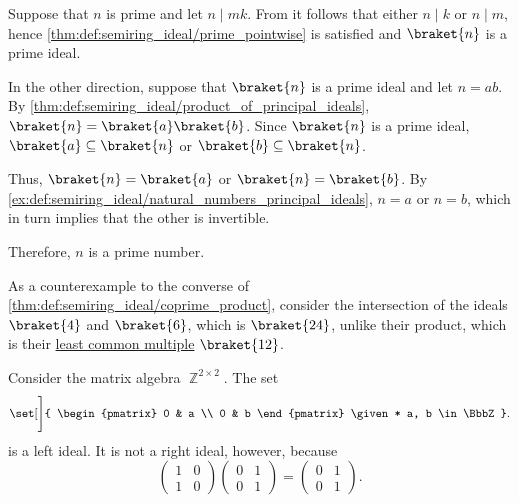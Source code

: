 \begin{example}
\begin{thmenum}
    Suppose that \( n \) is prime and let \( n \mid mk \). From  it follows that either \( n \mid k \) or \( n \mid m \), hence \cref{thm:def:semiring_ideal/prime_pointwise} is satisfied and \( \braket{ n } \) is a prime ideal.

    In the other direction, suppose that \( \braket{ n } \) is a prime ideal and let \( n = ab \). By \cref{thm:def:semiring_ideal/product_of_principal_ideals}, \( \braket{ n } = \braket{ a } \braket{ b } \). Since \( \braket{ n } \) is a prime ideal, \( \braket{ a } \subseteq \braket{ n } \) or \( \braket{ b } \subseteq \braket{ n } \).

    Thus, \( \braket{ n } = \braket{ a } \) or \( \braket{ n } = \braket{ b } \). By \cref{ex:def:semiring_ideal/natural_numbers_principal_ideals}, \( n = a \) or \( n = b \), which in turn implies that the other is invertible.

    Therefore, \( n \) is a prime number.

     As a counterexample to the converse of \cref{thm:def:semiring_ideal/coprime_product}, consider the intersection of the ideals \( \braket{ 4 } \) and \( \braket{ 6 } \), which is \( \braket{ 24 } \), unlike their product, which is their \hyperref[def:lcm]{least common multiple} \( \braket{ 12 } \).

     Consider the matrix algebra \( \BbbZ^{2 \times 2} \). The set
    \begin{equation*}
      \set[\Bigg]
      {
        \begin{pmatrix}
          0 & a \\
          0 & b
        \end{pmatrix}
        \given*
        a, b \in \BbbZ
      }.
    \end{equation*}
    is a left ideal. It is not a right ideal, however, because
    \begin{equation*}
      \begin{pmatrix}
        1 & 0 \\
        1 & 0
      \end{pmatrix}
      \begin{pmatrix}
        0 & 1 \\
        0 & 1
      \end{pmatrix}
      =
      \begin{pmatrix}
        0 & 1 \\
        0 & 1
      \end{pmatrix}.
    \end{equation*}


\end{thmenum}
\end{example}
